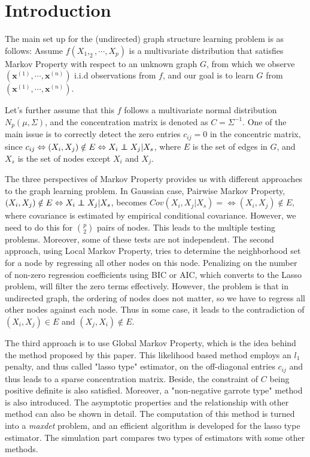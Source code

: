 
\color{SaddleBrown} %

\section*{Introduction}

The main set up for the (undirected) graph structure learning problem is as follows: Assume $f(X_1, _2, \cdots, X_p)$ is a multivariate distribution that satisfies Markov Property with respect to an unknown graph $G$, from which we observe $(\mathbf{x}^{(1)}, \cdots, \mathbf{x}^{(n)})$ i.i.d observations from $f$, and our goal is to learn $G$ from $(\mathbf{x}^{(1)}, \cdots, \mathbf{x}^{(n)})$. 

Let's further assume that this $f$ follows a multivariate normal distribution $N_p(\mu, \Sigma)$, and the concentration matrix is denoted as $C = \Sigma^{-1}$. One of the main issue is to correctly detect the zero entries $c_{ij} = 0$ in the concentric matrix, since $c_{ij} \Leftrightarrow (X_i, X_j) \notin E \Leftrightarrow X_i \independent X_j | X_s$, where $E$ is the set of edges in $G$, and $X_s$ is the set of nodes except $X_i$ and $X_j$. 

The three perspectives of Markov Property provides us with different approaches to the graph learning problem. In Gaussian case, Pairwise Markov Property, $(X_i, X_j) \notin E \Leftrightarrow X_i \independent X_j | X_s$, becomes $Cov(X_i, X_j | X_s) = \Leftrightarrow (X_i, X_j) \notin E$, where covariance is estimated by empirical conditional covariance. However, we need to do this for ${p \choose 2}$ pairs of nodes. This leads to the multiple testing problems. Moreover, some of these tests are not independent. The second approach, using Local Markov Property, tries to determine the neighborhood set for a node by regressing all other nodes on this node. Penalizing on the number of non-zero regression coefficients using BIC or AIC, which converts to the Lasso problem, will filter the zero terms effectively. However, the problem is that in undirected graph, the ordering of nodes does not matter, so we have to regress all other nodes against each node. Thus in some case, it leads to the contradiction of $(X_i, X_j) \in E$ and $(X_j, X_i) \notin E$.

The third approach is to use Global Markov Property, which is the idea behind the method proposed by this paper. This likelihood based method employs an $l_1$ penalty, and thus called "lasso type" estimator, on the off-diagonal entries $c_{ij}$ and thus leads to a sparse concentration matrix. Beside, the constraint of $C$ being positive definite is also satisfied. Moreover, a "non-negative garrote type" method is also introduced. The asymptotic properties and the relationship with other method can also be shown in detail. The computation of this method is turned into a \emph{maxdet} problem, and an efficient algorithm is developed for the lasso type estimator. The simulation part compares two types of estimators with some other methods. 